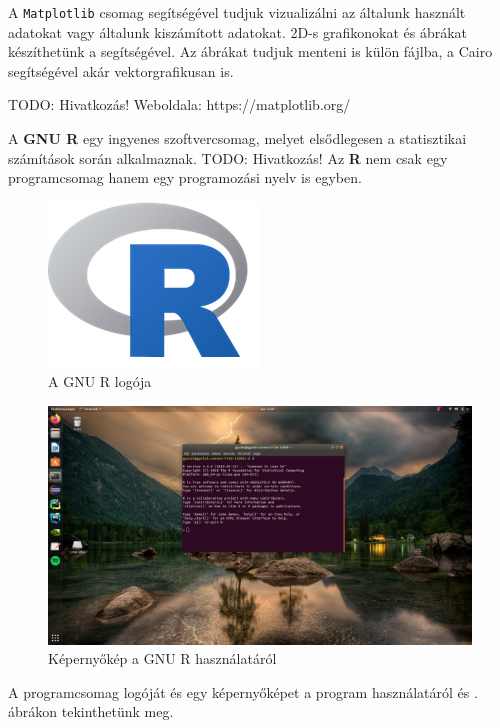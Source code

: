 A \texttt{Matplotlib} csomag segítségével tudjuk vizualizálni az
általunk használt adatokat vagy általunk kiszámított adatokat. 2D-s
grafikonokat és ábrákat készíthetünk a segítségével. Az ábrákat tudjuk
menteni is külön fájlba, a Cairo segítségével akár vektorgrafikusan is.

TODO: Hivatkozás! Weboldala: https://matplotlib.org/


A \textbf{GNU R} egy ingyenes szoftvercsomag, melyet elsődlegesen a
statisztikai számítások során alkalmaznak.
TODO: Hivatkozás! %
Az \textbf{R} nem csak egy
programcsomag hanem egy programozási nyelv is egyben.

\begin{figure}[h!]
\centering
\includegraphics{img/R_logo.png}
\caption{A GNU R logója}
\label{fig:r-logo}
\end{figure}

\begin{figure}[h!]
\centering
\includegraphics[width=\textwidth]{img/R_screen.png}
\caption{Képernyőkép a GNU R használatáról}
\label{fig:r-screenshot}
\end{figure}

A programcsomag logóját és egy képernyőképet a program használatáról  és . ábrákon tekinthetünk meg.

